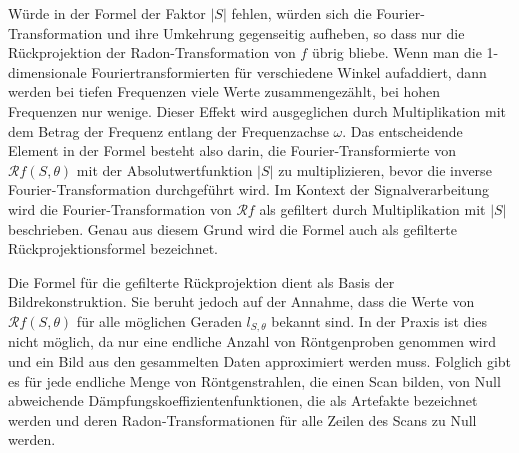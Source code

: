 Würde in der Formel der Faktor $|S|$ fehlen, würden sich die Fourier-Transformation und ihre Umkehrung gegenseitig aufheben, so dass nur die Rückprojektion der Radon-Transformation von $f$ übrig bliebe. Wenn man die 1-dimensionale Fouriertransformierten für verschiedene Winkel aufaddiert, dann werden bei tiefen Frequenzen viele Werte zusammengezählt, bei hohen Frequenzen nur wenige. Dieser Effekt wird ausgeglichen durch Multiplikation mit dem Betrag der Frequenz entlang der Frequenzachse $\omega$. Das entscheidende Element in der Formel besteht also darin, die Fourier-Transformierte von $\mathscr{R}f(S, \theta)$ mit der Absolutwertfunktion $|S|$ zu multiplizieren, bevor die inverse Fourier-Transformation durchgeführt wird. Im Kontext der Signalverarbeitung wird die Fourier-Transformation von $\mathscr{R}f$ als gefiltert durch Multiplikation mit $|S|$ beschrieben. Genau aus diesem Grund wird die Formel auch als \glqq gefilterte Rückprojektionsformel\grqq{} bezeichnet.

Die Formel für die gefilterte Rückprojektion dient als Basis der Bildrekonstruktion. Sie beruht jedoch auf der Annahme, dass die Werte von $\mathscr{R}f(S, \theta)$ für alle möglichen Geraden $l_{S, \theta}$ bekannt sind. In der Praxis ist dies nicht möglich, da nur eine endliche Anzahl von Röntgenproben genommen wird und ein Bild aus den gesammelten Daten approximiert werden muss. Folglich gibt es für jede endliche Menge von Röntgenstrahlen, die einen Scan bilden, von Null abweichende Dämpfungskoeffizientenfunktionen, die als Artefakte bezeichnet werden und deren Radon-Transformationen für alle Zeilen des Scans zu Null werden.





















